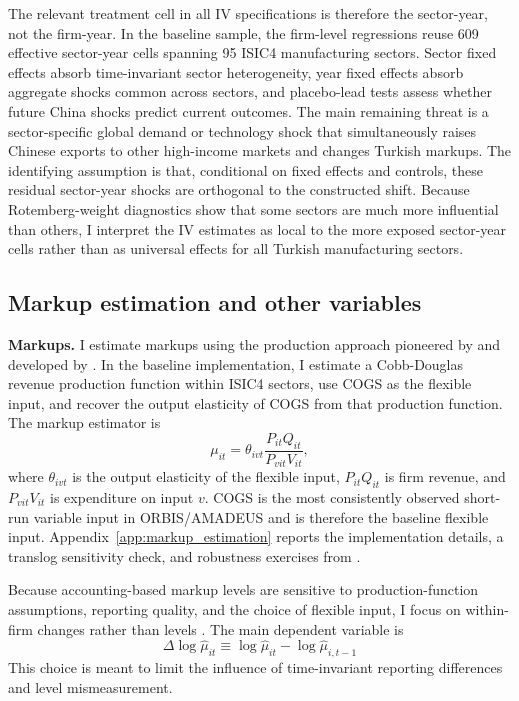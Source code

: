 ﻿\documentclass[12pt]{article}
\begin{document}
The relevant treatment cell in all IV specifications is therefore the sector-year, not the firm-year. In the baseline sample, the firm-level regressions reuse 609 effective sector-year cells spanning 95 ISIC4 manufacturing sectors. Sector fixed effects absorb time-invariant sector heterogeneity, year fixed effects absorb aggregate shocks common across sectors, and placebo-lead tests assess whether future China shocks predict current outcomes. The main remaining threat is a sector-specific global demand or technology shock that simultaneously raises Chinese exports to other high-income markets and changes Turkish markups. The identifying assumption is that, conditional on fixed effects and controls, these residual sector-year shocks are orthogonal to the constructed shift. Because Rotemberg-weight diagnostics show that some sectors are much more influential than others, I interpret the IV estimates as local to the more exposed sector-year cells rather than as universal effects for all Turkish manufacturing sectors.


\subsection{Markup estimation and other variables}

\textbf{Markups.} I estimate markups using the production approach pioneered by \textcite{hallRelationPriceMarginal1988} and developed by \textcite{deloeckerMarkupsFirmLevelExport2012,deloeckerRiseMarketPower2020}. In the baseline implementation, I estimate a Cobb-Douglas revenue production function within ISIC4 sectors, use COGS as the flexible input, and recover the output elasticity of COGS from that production function. The markup estimator is
\[
\mu_{it} = \theta_{ivt} \frac{P_{it}Q_{it}}{P_{vit}V_{it}},
\]
where $\theta_{ivt}$ is the output elasticity of the flexible input, $P_{it}Q_{it}$ is firm revenue, and $P_{vit}V_{it}$ is expenditure on input $v$. COGS is the most consistently observed short-run variable input in ORBIS/AMADEUS and is therefore the baseline flexible input. Appendix~\ref{app:markup_estimation} reports the implementation details, a translog sensitivity check, and robustness exercises from \textcite{kirovMeasuringMarkupsRevenue2026}.

Because accounting-based markup levels are sensitive to production-function assumptions, reporting quality, and the choice of flexible input, I focus on within-firm changes rather than levels \parencite{deridderHitchhikersGuideMarkup2026}. The main dependent variable is
\[
\Delta \log \hat{\mu}_{it} \equiv \log \hat{\mu}_{it} - \log \hat{\mu}_{i,t-1}
\]
This choice is meant to limit the influence of time-invariant reporting differences and level mismeasurement.
\end{document}
